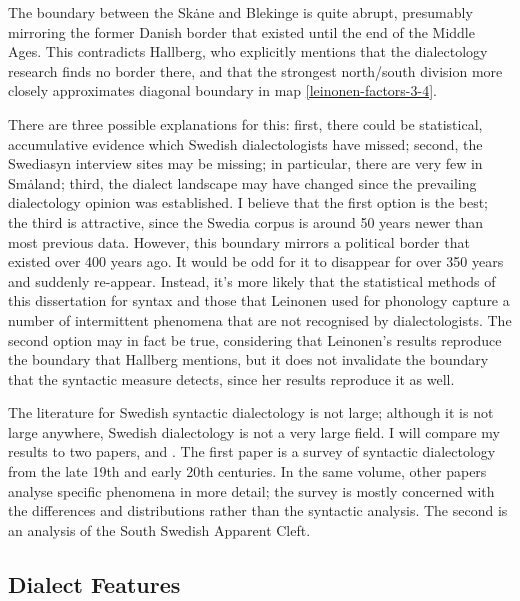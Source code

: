 The boundary between the Sk\.ane and Blekinge is quite abrupt,
presumably mirroring the former Danish border that existed until the
end of the Middle Ages. This contradicts Hallberg, who explicitly
mentions that the dialectology research finds no border there, and
that the strongest north/south division more closely approximates
 diagonal boundary in map
\ref{leinonen-factors-3-4}.

There are three possible explanations for this: first, there could be
statistical, accumulative evidence which Swedish dialectologists have
missed; second, the Swediasyn interview sites may be missing; in
particular, there are very few in Sm\.aland; third, the dialect
landscape may have changed since the prevailing dialectology opinion
was established. I believe that the first option is the best; the
third is attractive, since the Swedia corpus is around 50 years newer
than most previous data. However, this boundary mirrors a political
border that existed over 400 years ago. It would be odd for it to
disappear for over 350 years and suddenly re-appear. Instead, it's
more likely that the statistical methods of this dissertation for
syntax and those that Leinonen used for phonology capture a number of
intermittent phenomena that are not recognised by dialectologists.
The second option may in fact be true, considering that Leinonen's
results reproduce the boundary that Hallberg mentions, but it does not
invalidate the boundary that the syntactic measure detects, since her
results reproduce it as well.


The literature for Swedish syntactic dialectology is not large;
although it is not large anywhere, Swedish dialectology is not a very
large field. I will compare my results to two papers,
 and . The first paper is a
survey of syntactic dialectology from the late 19th and early 20th
centuries. In the same volume, other papers analyse specific phenomena
in more detail; the survey is mostly concerned with the differences
and distributions rather than the syntactic analysis. The second
is an analysis of the South Swedish Apparent Cleft.

\subsection{Dialect Features}

